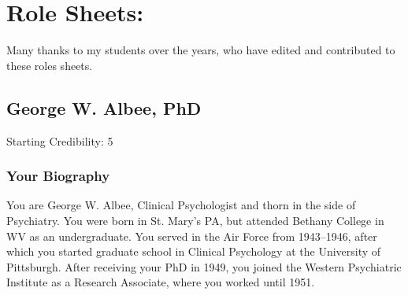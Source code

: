 \stopcontents[instructors]


\pagebreak 


\frontmatter 

\part{Role Sheets:}
\label{rolesheets:}

 \begin{refsection}
\def\mysubtitle{The struggle for legitimacy of psychology and psychiatry in the 1970’s\\ \large Role Sheets}

\maketitle
\newpage
\startcontents[rolesheets]

\listoftheorems[ignoreall,show={mycommittees,myassign,myresearch,myproposal}]


\renewcommand*{\thechapter}{\arabic{chapter}}
\setcounter{chapter}{0}
\mainmatter

Many thanks to my students over the years, who have edited and contributed to these roles sheets.

\chapter{George W. Albee, PhD}
\label{georgew.albeephd}

Starting Credibility: 5

\section{Your Biography}
\label{yourbiography}

You are George W. Albee, Clinical Psychologist and thorn in the side of Psychiatry. You were born in St. Mary's PA, but attended Bethany College in WV as an undergraduate. You served in the Air Force from 1943--1946, after which you started graduate school in Clinical Psychology at the University of Pittsburgh. After receiving your PhD in 1949, you joined the Western Psychiatric Institute as a Research Associate, where you worked until 1951.


\end{refsection}
